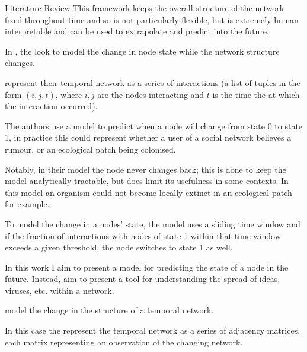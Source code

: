 \documentclass[12pt]{amsart}
\begin{document}
\begin{section}{Literature Review}
        This framework keeps the overall structure of the network fixed throughout time and so is not particularly flexible, but is extremely human interpretable and can be used to extrapolate and predict into the future. 

        In \cite{KARIMI20133476}, the  look to model the change in node state while the network structure changes. 
        
         represent their temporal network as a series of interactions (a list of tuples in the form $(i,j,t)$, where $i,j$ are the nodes interacting and $t$ is the time the at which the interaction occurred). 
        
        The authors use a model to predict when a node will change from state 0 to state 1, in practice this could represent whether a user of a social network believes a rumour, or an ecological patch being colonised. 
        
        Notably, in their model the node never changes back; this is done to keep the model analytically tractable, but does limit its usefulness in some contexts. In this model an organism could not become locally extinct in an ecological patch for example. 
        
        To model the change in a nodes' state, the model uses a sliding time window and if the fraction of interactions with nodes of state 1 within that time window exceeds a given threshold, the node switches to state 1 as well. 

        In this work I aim to present a model for predicting the state of a node in the future. Instead,  aim to present a tool for understanding the spread of ideas, viruses, etc. within a network.

        \cite{sanna2021link} model the change in the structure of a temporal network. 
        
        In this case the  represent the temporal network as a series of adjacency matrices, each matrix representing an observation of the changing network. 
        

\end{section}
\end{document}
